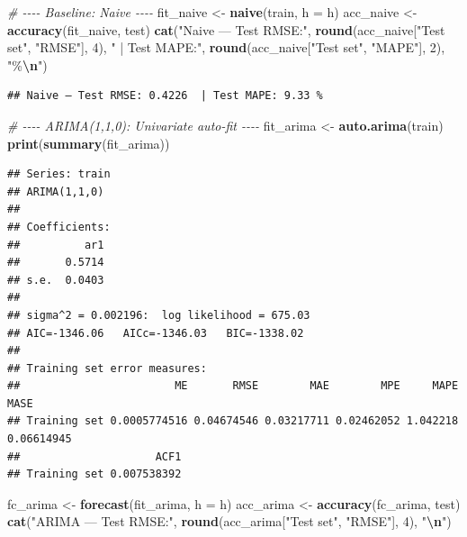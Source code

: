 \documentclass[
]{article}
\newenvironment{Shaded}{\begin{snugshade}}{\end{snugshade}}
\newcommand{\AttributeTok}[1]{\textcolor[rgb]{0.13,0.29,0.53}{#1}}
\newcommand{\CommentTok}[1]{\textcolor[rgb]{0.56,0.35,0.01}{\textit{#1}}}
\newcommand{\DecValTok}[1]{\textcolor[rgb]{0.00,0.00,0.81}{#1}}
\newcommand{\FunctionTok}[1]{\textcolor[rgb]{0.13,0.29,0.53}{\textbf{#1}}}
\newcommand{\NormalTok}[1]{#1}
\newcommand{\OtherTok}[1]{\textcolor[rgb]{0.56,0.35,0.01}{#1}}
\newcommand{\SpecialCharTok}[1]{\textcolor[rgb]{0.81,0.36,0.00}{\textbf{#1}}}
\newcommand{\StringTok}[1]{\textcolor[rgb]{0.31,0.60,0.02}{#1}}
\begin{document}
\begin{Shaded}
\begin{Highlighting}[]
\CommentTok{\# {-}{-}{-}{-} Baseline: Naive {-}{-}{-}{-}}
\NormalTok{fit\_naive }\OtherTok{\textless{}{-}} \FunctionTok{naive}\NormalTok{(train, }\AttributeTok{h =}\NormalTok{ h)}
\NormalTok{acc\_naive }\OtherTok{\textless{}{-}} \FunctionTok{accuracy}\NormalTok{(fit\_naive, test)}
\FunctionTok{cat}\NormalTok{(}\StringTok{"Naive — Test RMSE:"}\NormalTok{, }\FunctionTok{round}\NormalTok{(acc\_naive[}\StringTok{"Test set"}\NormalTok{, }\StringTok{"RMSE"}\NormalTok{], }\DecValTok{4}\NormalTok{),}
    \StringTok{" | Test MAPE:"}\NormalTok{, }\FunctionTok{round}\NormalTok{(acc\_naive[}\StringTok{"Test set"}\NormalTok{, }\StringTok{"MAPE"}\NormalTok{], }\DecValTok{2}\NormalTok{), }\StringTok{"\%}\SpecialCharTok{\textbackslash{}n}\StringTok{"}\NormalTok{)}
\end{Highlighting}
\end{Shaded}

\begin{verbatim}
## Naive — Test RMSE: 0.4226  | Test MAPE: 9.33 %
\end{verbatim}

\begin{Shaded}
\begin{Highlighting}[]
\CommentTok{\# {-}{-}{-}{-} ARIMA(1,1,0): Univariate auto{-}fit {-}{-}{-}{-}}
\NormalTok{fit\_arima }\OtherTok{\textless{}{-}} \FunctionTok{auto.arima}\NormalTok{(train)}
\FunctionTok{print}\NormalTok{(}\FunctionTok{summary}\NormalTok{(fit\_arima))}
\end{Highlighting}
\end{Shaded}

\begin{verbatim}
## Series: train 
## ARIMA(1,1,0) 
## 
## Coefficients:
##          ar1
##       0.5714
## s.e.  0.0403
## 
## sigma^2 = 0.002196:  log likelihood = 675.03
## AIC=-1346.06   AICc=-1346.03   BIC=-1338.02
## 
## Training set error measures:
##                        ME       RMSE        MAE        MPE     MAPE       MASE
## Training set 0.0005774516 0.04674546 0.03217711 0.02462052 1.042218 0.06614945
##                     ACF1
## Training set 0.007538392
\end{verbatim}

\begin{Shaded}
\begin{Highlighting}[]
\NormalTok{fc\_arima  }\OtherTok{\textless{}{-}} \FunctionTok{forecast}\NormalTok{(fit\_arima, }\AttributeTok{h =}\NormalTok{ h)}
\NormalTok{acc\_arima }\OtherTok{\textless{}{-}} \FunctionTok{accuracy}\NormalTok{(fc\_arima, test)}
\FunctionTok{cat}\NormalTok{(}\StringTok{"ARIMA — Test RMSE:"}\NormalTok{, }\FunctionTok{round}\NormalTok{(acc\_arima[}\StringTok{"Test set"}\NormalTok{, }\StringTok{"RMSE"}\NormalTok{], }\DecValTok{4}\NormalTok{), }\StringTok{"}\SpecialCharTok{\textbackslash{}n}\StringTok{"}\NormalTok{)}
\end{Highlighting}
\end{Shaded}
\end{document}
